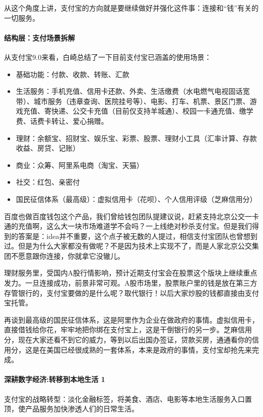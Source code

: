 \documentclass[letterpaper,11pt,english]{sphinxmanual}
\begin{document}
从这个角度上讲，支付宝的方向就是要继续做好并强化这件事：连接和“钱”有关的一切服务。


\paragraph{结构层：支付场景拆解}
\label{\detokenize{chapter_dive/alipay:id5}}
从支付宝9.0来看，白崎总结了一下目前支付宝已涵盖的使用场景：
\begin{itemize}
\item {} 
基础功能：付款、收款、转账、汇款

\item {} 
生活服务：手机充值、信用卡还款、外卖、生活缴费（水电燃气电视固话宽带）、城市服务（违章查询、医院挂号等）、电影、打车、机票、景区门票、游戏充值、寄快递、公交卡充值（目前仅支持羊城通）、校园一卡通充值、缴学费、话费卡转让、爱心捐赠。

\item {} 
理财：余额宝、招财宝、娱乐宝、彩票、股票、理财小工具（汇率计算、存款收益、房贷、记账）

\item {} 
商业：众筹、阿里系电商（淘宝、天猫）

\item {} 
社交：红包、亲密付

\item {} 
国民征信体系（最高级）：虚拟信用卡（花呗）、个人信用评级（芝麻信用分）

\end{itemize}

百度也做百度钱包这个产品，我们曾给钱包团队提建议说，赶紧支持北京公交一卡通的充值啊，这么大一块市场难道学不会吗？一上线绝对秒杀支付宝。但是我们得到的答案是：idea并不重要，这个点子被无数的人提过，相信支付宝团队也曾想到过。但是为什么大家都没有做呢？不是因为技术上实现不了，而是人家北京公交集团不愿意跟你连接，你就拿它没辙儿。

理财服务里，受国内A股行情影响，预计近期支付宝会在股票这个版块上继续重点发力。一旦连接成功，前景非常可观。A股市场里，股票账户里的钱是放在第三方存管银行的，支付宝要做的是什么呢？取代银行！以后大家炒股的钱都直接由支付宝托管。

再谈到最高级的国民征信体系，这是阿里作为企业在做政府的事情。虚拟信用卡，直接借钱给你花，牢牢地把你绑在支付宝上，这是干倒银行的另一步。芝麻信用分，现在大家还看不到它的威力，等到以后出国办签证，贷款买房，通通看你的信用分，这是在美国已经很成熟的一套体系，本来是政府的事情，支付宝却抢先来完成。


\paragraph{深耕数字经济:转移到本地生活 1\sphinxfootnotemark[309]}
\label{\detokenize{chapter_dive/alipay:id6}}%
\begin{footnotetext}[309]\sphinxAtStartFootnote
{}
%
\end{footnotetext}\ignorespaces 
支付宝的战略转型：淡化金融标签，将美食、酒店、电影等本地生活服务入口置顶，使产品服务加快渗透人们的日常生活。
\end{document}
